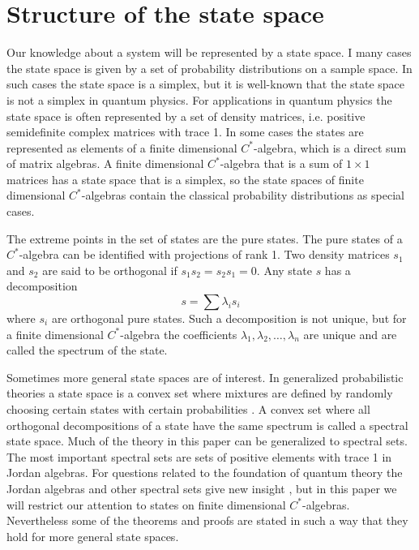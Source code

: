 \documentclass[10pt,a4paper,draft]{article}
\begin{document}
\section{Structure of the state space}

Our knowledge about a system will be represented by a state
space. I many cases the state space is given by a set of probability
distributions on a sample space. In such cases the state space is a simplex,
but it is well-known that the state space is not a simplex in
quantum physics. For applications in quantum physics the state space is
often represented by a set of density matrices, i.e. positive
semidefinite complex matrices with trace 1. In some cases the states are represented
as elements of a finite dimensional $C^{*}$-algebra, which is a direct sum of matrix
algebras. A finite dimensional $C^{*}$-algebra that is a sum of $1\times1$ matrices has a state space that is a simplex, so the state spaces of finite dimensional $C^{*}$-algebras contain the classical probability distributions as special
cases.

The extreme points in the set of states are the pure states. The
pure states of a $C^{*}$-algebra can be identified with projections
of rank 1. Two density matrices $s_{1}$ and $s_{2}$ are said to be
orthogonal if $s_{1}s_{2}=s_{2}s_{1}=0.$ Any state $s$ has a
decomposition
\[
s=\sum\lambda_{i}s_{i}
\]
where $s_{i}$ are orthogonal pure states. Such a decomposition
is not unique, but for a finite dimensional $C^{*}$-algebra the coefficients
$\lambda_{1},\lambda_{2},\dots,\lambda_{n}$
are unique and are called the spectrum of the state. 

Sometimes more general state spaces 
are of interest. In generalized probabilistic theories a state space is a convex set where
mixtures are defined by randomly choosing certain states with
certain probabilities \cite{Holevo1982,Krumm2016}. A convex set where all orthogonal
decompositions of a state have the same spectrum is called a spectral state
space. Much of the theory in this paper can be generalized to spectral sets.
The most important spectral sets are sets of positive elements with  trace 1
in Jordan algebras. For questions related to the foundation of
quantum theory the Jordan algebras and other spectral sets give new
insight \cite{Barnum2014,Harremoes2016d,Harremoes2017a},
but in this paper we will restrict our attention to states on
finite dimensional $C^{*}$-algebras. Nevertheless some of the
theorems and proofs are
stated in such a way that they hold for more general state
spaces.
\end{document}
